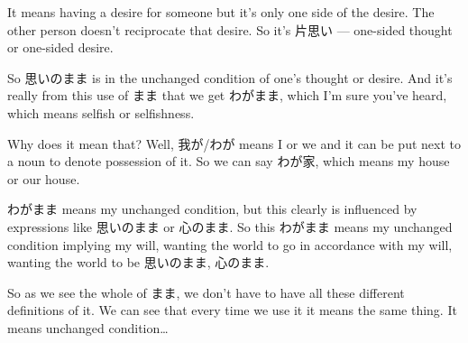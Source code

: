 It means having a desire for someone but it's only one side of the desire. The other person doesn't reciprocate that desire. So it's 片思い --- one-sided thought or one-sided desire.

So 思いのまま is in the unchanged condition of one's thought or desire. And it's really from this use of まま that we get わがまま, which I'm sure you've heard, which means selfish or selfishness.

{}

Why does it mean that? Well, 我が/わが means I or we and it can be put next to a noun to denote possession of it. So we can say わが家, which means my house or our house.

わがまま means my unchanged condition, but this clearly is influenced by expressions like 思いのまま or 心のまま. So this わがまま means my unchanged condition implying my will, wanting the world to go in accordance with my will, wanting the world to be 思いのまま, 心のまま.

So as we see the whole of まま, we don't have to have all these different definitions of it. We can see that every time we use it it means the same thing. It means unchanged condition\ldots{}

\stopsectionlevel
